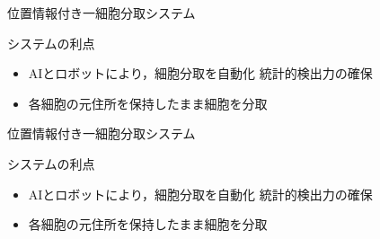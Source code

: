 \begin{frame}{位置情報付き一細胞分取システム}
    \begin{block}{システムの利点}
        \begin{itemize}
            \item AIとロボットにより，細胞分取を自動化 \Ra 統計的検出力の確保
            \item 各細胞の元住所を保持したまま細胞を分取 \Ra {}
        \end{itemize}
    \end{block}
    \vspace{-1zh}
\end{frame}
\begin{frame}[noframenumbering]{位置情報付き一細胞分取システム}
    \begin{block}{システムの利点}
        \begin{itemize}
            \item AIとロボットにより，細胞分取を自動化 \Ra 統計的検出力の確保
            \item 各細胞の元住所を保持したまま細胞を分取 \Ra {}
        \end{itemize}
    \end{block}
    \vspace{-1zh}
\end{frame}